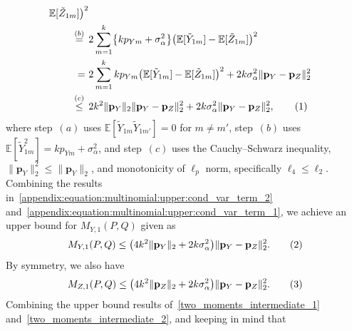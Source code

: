 \documentclass[twoside,11pt]{article}
\newcommand\numberthis{\addtocounter{equation}{1}\tag{\theequation}}
\newcommand{\rvTwo}{Y}
\newcommand{\rvThree}{Z}
\newcommand{\mE}{\mathbb{E}} %
\newcommand{\alphabetSize}{k} %
\newcommand{\vectorIndex}{m}
\newcommand{\probVecElement}[2]{p_{{#1}{#2}}}
\newcommand{\probVec}{\mathbf{p}} %
\newcommand{\kernelMoment}{M} %
\newcommand{\dataGenDist}{P}  %
\newcommand{\privacyMechanism}{Q}
\newcommand{\privacyParameter}{\alpha} %
\newcommand{\LapUParam}{\sigma_{\privacyParameter}}
\newcommand{\momentTwosampleVarCondexpY}{\kernelMoment_{\rvTwo,1}(\dataGenDist, \privacyMechanism)}
\newcommand{\momentTwosampleVarCondexpZ}{\kernelMoment_{\rvThree,1}(\dataGenDist, \privacyMechanism)}
\begin{document}
\begin{appendix}
\begin{itemize}
\begin{align*}
		\mE [ \tilde{\rvThree}_{1 \vectorIndex}]
		\bigr)^2 
		\\ \stackrel{(b)}{=} \hskip 1.57mm &
		2\sum_{\vectorIndex=1}^\alphabetSize
		\bigl\{ \alphabetSize \probVecElement{\rvTwo}{\vectorIndex} + \LapUParam^2 \bigr\}
		\bigl(
		\mE [ \tilde{\rvTwo}_{1 \vectorIndex}]
		-
		\mE [ \tilde{\rvThree}_{1 \vectorIndex}]
		\bigr)^2
		\\ =~&
		2\sum_{\vectorIndex=1}^\alphabetSize
		\alphabetSize \probVecElement{\rvTwo}{\vectorIndex}
		\bigl(
		\mE [ \tilde{\rvTwo}_{1 \vectorIndex}]
		-
		\mE [ \tilde{\rvThree}_{1 \vectorIndex}]
		\bigr)^2
		+ 
		2 \alphabetSize \LapUParam^2
		\|\probVec_\rvTwo - \probVec_\rvThree\|_2^2
		\\\stackrel{(c)}{\leq}\hskip 1.57mm &
		2
		\alphabetSize^2 \|\probVec_\rvTwo\|_2
		\|\probVec_\rvTwo - \probVec_\rvThree\|_2^2
		+ 
		2 \alphabetSize \LapUParam^2
		\|\probVec_\rvTwo - \probVec_\rvThree\|_2^2,
		\numberthis \label{appendix:equation:multinomial:upper:cond_var_term_1}
	\end{align*}
	where step~$(a)$ uses $\mE[ \tilde{\rvTwo}_{1 \vectorIndex}  \tilde{\rvTwo}_{1 \vectorIndex'}] = 0$ for $m \neq m'$, 
	step~$(b)$ uses 
	$
	\mE[ \tilde{\rvTwo}_{1 \vectorIndex}^2] =\alphabetSize \probVecElement{\rvTwo}{\vectorIndex} +  \LapUParam^2$,
	and step~$(c)$ uses 
	the Cauchy--Schwarz inequality, 
	$\|\probVec_\rvTwo\|_2^2 \leq \|\probVec_\rvTwo\|_2$,
	and monotonicity of $\ell_p$ norm, specifically $\ell_4 \leq \ell_2$.
	Combining the results in~\eqref{appendix:equation:multinomial:upper:cond_var_term_2} and~\eqref{appendix:equation:multinomial:upper:cond_var_term_1}, we achieve an upper bound for $\momentTwosampleVarCondexpY $ given as 
	\begin{align*}
		\momentTwosampleVarCondexpY 
		\leq
		\bigl(
		4 \alphabetSize^2 \|\probVec_\rvTwo\|_2 
		+
		2 \alphabetSize \LapUParam^2
		\bigr)
		\|\probVec_\rvTwo - \probVec_\rvThree\|_2^2.
		\numberthis \label{two_moments_intermediate_1}
	\end{align*}
	By symmetry, we also have
	\begin{align*}
		\momentTwosampleVarCondexpZ
		\leq
		\bigl(
		4 \alphabetSize^2 \|\probVec_\rvThree\|_2 
		+
		2 \alphabetSize \LapUParam^2
		\bigr)
		\|\probVec_\rvTwo - \probVec_\rvThree\|_2^2.
		\numberthis \label{two_moments_intermediate_2}
	\end{align*}
	Combining the upper bound results of~\eqref{two_moments_intermediate_1} and~\eqref{two_moments_intermediate_2}, and keeping in mind that

\end{itemize}
\end{appendix}
\end{document}
